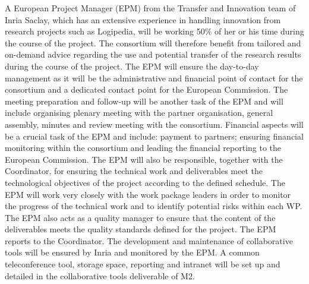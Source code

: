 \begin{workpackage}[id=management,type=MGT,wphases=1-48,
  short=Management,
  title=Management,
  lead=Inr,InrRM=50,BirRM=1,InnRM=1,SacRM=1,TumRM=1,LeeRM=1]
\begin{tasklist}
  \begin{task}[id=admin,title=Administrative and Financial Management,lead=Inr,InrRM=24,wphases=1-48]
    A European Project Manager (EPM) from the Transfer and Innovation
    team of Inria Saclay, which has an extensive experience in handling
    innovation from research projects such as Logipedia, will be working
    50\% of her or his time during the course of the project.
     The
    consortium will therefore benefit from tailored and on-demand
    advice regarding the use and potential transfer of the research
    results during the course of the project.  The EPM will ensure the
    day-to-day management as it will be the administrative and
    financial point of contact for the consortium and a dedicated
    contact point for the European Commission. The meeting preparation
    and follow-up will be another task of the EPM and will include
    organising plenary meeting with the partner organisation, general
    assembly, minutes and review meeting with the consortium. Financial
    aspects will be a crucial task of the EPM and include: payment to
    partners; ensuring financial monitoring within the consortium and
    leading the financial reporting to the European Commission.  The
    EPM will also be responsible, together with the 
    Coordinator, for ensuring the technical work and deliverables meet
    the technological objectives of the project according to the
    defined schedule. The EPM will work very closely with the work
    package leaders in order to monitor the progress of the technical
    work and to identify potential risks within each WP. The EPM also
    acts as a quality manager to ensure that the content of the
    deliverables meets the quality standards defined for the
    project. The EPM reports to the Coordinator.  The
    development and maintenance of collaborative tools will be ensured
    by Inria and monitored by the EPM. A common teleconference tool,
    storage space, reporting and intranet will be set up and detailed
    in the collaborative tools deliverable of M2.
  \end{task}


\end{tasklist}
\end{workpackage}

